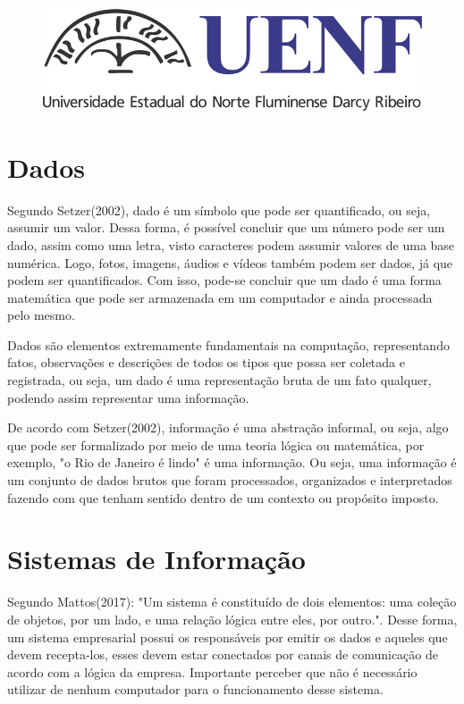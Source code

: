\documentclass[12pt,a4paper,english,brazil]{abntex2}
\begin{document}
	\begin{figure}
		\centering
		\includegraphics[width=0.7\linewidth]{3-uenf_horizontal}
		\caption{}
		\label{fig:3-uenfhorizontal}
	\end{figure}

	\maketitle

	\section{Dados}
	
	Segundo Setzer(2002), dado é um símbolo que pode ser quantificado, ou seja, assumir um valor. Dessa forma, é possível concluir que um número pode ser um dado, assim como uma letra, visto caracteres podem assumir valores de uma base numérica. Logo, fotos, imagens, áudios e vídeos também podem ser dados, já que podem ser quantificados. Com isso, pode-se concluir que um dado é uma forma matemática que pode ser armazenada em um computador e ainda processada pelo mesmo.
	
	Dados são elementos extremamente fundamentais na computação, representando fatos, observações e descrições de todos os tipos que possa ser coletada e registrada, ou seja, um dado é uma representação bruta de um fato qualquer, podendo assim representar uma informação.
	
	De acordo com Setzer(2002), informação é uma abstração informal, ou seja, algo que pode ser formalizado por meio de uma teoria lógica ou matemática, por exemplo, "o Rio de Janeiro é lindo" é uma informação. Ou seja, uma informação é um conjunto de dados brutos que foram processados, organizados e interpretados fazendo com que tenham sentido dentro de um contexto ou propósito imposto.
	
	\section{Sistemas de Informação}
	
	Segundo Mattos(2017): "Um sistema é constituído de dois elementos: uma coleção de objetos, por um lado, e uma relação lógica entre eles, por outro.". Desse forma, um sistema empresarial possui os responsáveis por emitir os dados e aqueles que devem recepta-los, esses devem estar conectados por canais de comunicação de acordo com a lógica da empresa. Importante perceber que não é necessário utilizar de nenhum computador para o funcionamento desse sistema.
	
\end{document}
